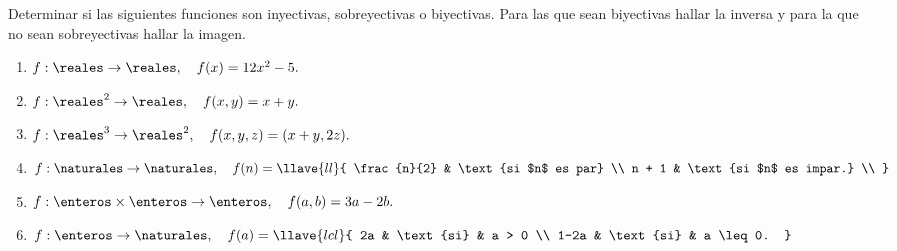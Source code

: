 \begin{enunciado}{\ejercicio}
  Determinar si las siguientes funciones son inyectivas, sobreyectivas o biyectivas.
  Para las que sean biyectivas hallar la inversa y para la que no sean sobreyectivas hallar la imagen.
  \begin{enumerate}[label=\roman*)]
    \item $f: \reales \to \reales,\quad f(x) = 12x^2 -5.$

    \item $f: \reales^2 \to \reales,\quad f(x,y) = x + y.$

    \item $f: \reales^3 \to \reales^2,\quad f(x,y,z) = (x+y,2z).$

    \item $f: \naturales \to \naturales,\quad
            f(n) =
            \llave{ll}{
              \frac{n}{2} & \text{si $n$ es par}    \\
              n + 1       & \text{si $n$ es impar.} \\
            }$

    \item $f: \enteros \times \enteros \to \enteros,\quad f(a,b) = 3a - 2b.$

    \item $f: \enteros \to \naturales,\quad f(a) =
            \llave{lcl}{
              2a   & \text{si} & a > 0     \\
              1-2a & \text{si} & a \leq 0.
            }$
  \end{enumerate}
\end{enunciado}

